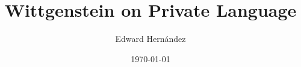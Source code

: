 \documentclass[doc,12pt,apacite,biblatex]{apa6}
\begin{document}
\title{Wittgenstein on Private Language}
\author{Edward Hern\'{a}ndez}
\date{\today}

\maketitle

\nocite{Wittgenstein53}

\clearpage

{}  \printindex[autx]
\end{document}
